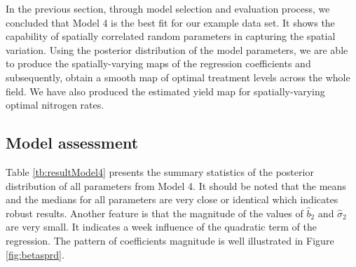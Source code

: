 \documentclass[a4paper]{article}   	%
\begin{document}
	In the previous section, through model selection and evaluation process, we concluded that Model 4 is the best fit for our example data set. It shows the capability of spatially correlated random parameters in capturing the spatial variation. Using the posterior distribution of the model parameters, we are able to produce the spatially-varying maps of the regression coefficients and subsequently, obtain a smooth map of optimal treatment levels across the whole field. We have also produced the estimated yield map for spatially-varying optimal nitrogen rates. 
		
	
	\subsection{Model assessment}
	Table \ref{tb:resultModel4} presents the summary statistics of the posterior distribution of all parameters from Model 4. It should be noted that the means and the medians for all parameters are very close or identical which indicates robust results. Another feature is that the magnitude of the values of $\hat{b}_2$ and $\hat{\sigma}_2$ are very small. It indicates a week influence of the quadratic term of the regression. The pattern of coefficients magnitude is well illustrated in Figure \ref{fig:betasprd}.
	
\end{document}
